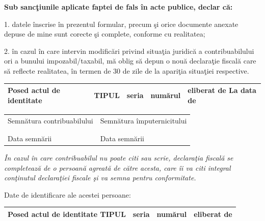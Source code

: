 \documentclass[10pt,a4paper,landscape]{article}
\newcommand{\fillline}[1][6cm]{\underline{\hspace{#1}}}
\begin{document}
\vspace{0.3cm}

\textbf{Sub sancţiunile aplicate faptei de fals în acte publice, declar că:}

1. datele înscrise în prezentul formular, precum şi orice documente anexate depuse de mine sunt corecte şi complete, conforme cu realitatea;

2. în cazul în care intervin modificări privind situaţia juridică a contribuabilului ori a bunului impozabil/taxabil, mă oblig să depun o nouă declaraţie fiscală care să reflecte realitatea, în termen de 30 de zile de la apariţia situaţiei respective.

\vspace{0.3cm}

\begin{tabularx}{\textwidth}{|X|X|X|X|X|}
\hline
Posed actul de identitate & TIPUL \fillline[2cm] & seria \fillline[2cm] & numărul \fillline[3cm] & eliberat de \fillline[3cm] \quad La data de \fillline[2.5cm] \\
\hline
\end{tabularx}

\vspace{0.5cm}

\begin{tabularx}{\textwidth}{|X|X|}
\hline
Semnătura contribuabilului & Semnătura împuternicitului \\
& \\
\fillline[7cm] & \fillline[7cm] \\
Data semnării \fillline[4cm] & Data semnării \fillline[4cm] \\
\hline
\end{tabularx}

\vspace{0.5cm}

\footnotesize\textit{În cazul în care contribuabilul nu poate citi sau scrie, declaraţia fiscală se completează de o persoană agreată de către acesta, care îi va citi integral conţinutul declaraţiei fiscale şi va semna pentru conformitate.}\normalsize

\vspace{0.3cm}

Date de identificare ale acestei persoane:

\begin{tabularx}{\textwidth}{|X|X|X|X|}
\hline
Posed actul de identitate TIPUL \fillline[2cm] & seria \fillline[2cm] & numărul \fillline[3cm] & eliberat de \fillline[3cm] \\
\hline
\end{tabularx}
\end{document}

